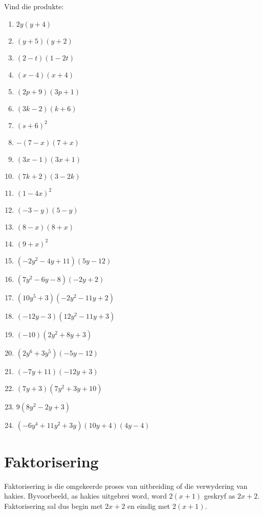 \begin{exercises}{}
{
Vind die produkte:

\begin{multicols}{2}
\begin{enumerate}[label=\textbf{\arabic*}., itemsep=5pt]
\item $2y(y+4)$ 
\item $(y+5)(y+2) $
\item $(2-t)(1-2t)$
\item $(x-4)(x+4)$
\item $ (2p+9)(3p+1)$
\item $(3k-2)(k+6)$
\item $(s+6)^2$
\item $-(7-x)(7+x)$
\item $(3x-1)(3x+1)$
\item $(7k+2)(3-2k)$
\item $(1-4x)^2$
\item $(-3-y)(5-y)$
\item $(8-x)(8+x)$
\item $(9+x)^2$
\item$(-2{y}^{2}-4y+11)(5y-12)$ 
\item$(7{y}^{2}-6y-8)(-2y+2)$%
\item$(10{y}^{5}+3)(-2{y}^{2}-11y+2)$ 
\item$(-12y-3)(12{y}^{2}-11y+3)$%
\item$(-10)(2{y}^{2}+8y+3)$ 
\item$(2{y}^{6}+3{y}^{5})(-5y-12)$%
\item$(-7y+11)(-12y+3)$%
\item$(7y+3)(7{y}^{2}+3y+10)$%
\item$9(8{y}^{2}-2y+3)$ 
\item$(-6{y}^{4}+11{y}^{2}+3y)(10y+4)(4y-4)$ 
\end{enumerate}
\end{multicols}

}
\end{exercises}





\section{Faktorisering}

Faktorisering is die omgekeerde proses van uitbreiding of die verwydering van hakies. Byvoorbeeld, as hakies uitgebrei word, word $2(x+1)$ geskryf as $2x+2$. Faktorisering sal dus begin met $2x+2$ en eindig met $2(x+1)$. 

